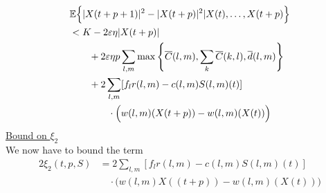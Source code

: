 \begin{align} \nonumber
&\expectation{\vert X(t + p +  1)\vert^2 - \vert  X(t + p)\vert^2 \vert X(t),\ldots,X(t + p)}  \\ \nonumber
& < K  -2 \varepsilon \eta \vert X(t + p) \vert  \\ \nonumber
&\qquad + 2\varepsilon \eta p \sum_{l,m} \max\left\{ \overline{C}(l,m),\sum_{k}\overline{C}(k,l),\overline d(l,m) \right\} \\ \nonumber
&  \qquad +2 \sum_{l,m} [f_{l}r(l,m) - c(l,m)S(l,m)(t) ]\\
&\qquad \qquad \cdot\Big(w(l,m)(X(t + p) ) - w(l,m)(X(t))\Big) \label{combined1}
\end{align}
%
\underline{Bound on $\xi_{2}$} \\
We now have to bound the term
\begin{align}\nonumber
2\xi_2(t,p,S) &= 2\sum_{l,m} [f_{l}r(l,m) - c(l,m)S(l,m)(t) ]\\
&\quad \cdot \Big(w(l,m)X((t + p) ) - w(l,m)(X(t))\Big)
\label{2xi2}
\end{align}
%
%
